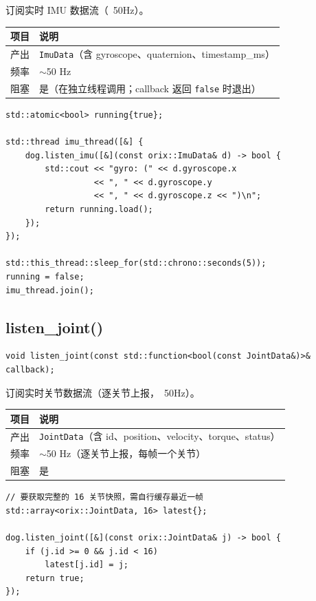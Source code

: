 \documentclass[a4paper,11pt,openany]{book}
\begin{document}
订阅实时 IMU 数据流（~50Hz）。

\begin{longtable}{ll}
\toprule
项目 & 说明 \\
\midrule
\endhead
产出 & \texttt{ImuData}（含 gyroscope、quaternion、timestamp\_ms）\\
频率 & $\sim$50 Hz \\
阻塞 & 是（在独立线程调用；callback 返回 \texttt{false} 时退出）\\
\bottomrule
\end{longtable}

\begin{lstlisting}[style=cpp]
std::atomic<bool> running{true};

std::thread imu_thread([&] {
    dog.listen_imu([&](const orix::ImuData& d) -> bool {
        std::cout << "gyro: (" << d.gyroscope.x
                  << ", " << d.gyroscope.y
                  << ", " << d.gyroscope.z << ")\n";
        return running.load();
    });
});

std::this_thread::sleep_for(std::chrono::seconds(5));
running = false;
imu_thread.join();
\end{lstlisting}

\subsection{listen\_joint()}

\begin{lstlisting}[style=cpp,numbers=none]
void listen_joint(const std::function<bool(const JointData&)>& callback);
\end{lstlisting}

订阅实时关节数据流（逐关节上报，~50Hz）。

\begin{longtable}{ll}
\toprule
项目 & 说明 \\
\midrule
\endhead
产出 & \texttt{JointData}（含 id、position、velocity、torque、status）\\
频率 & $\sim$50 Hz（逐关节上报，每帧一个关节）\\
阻塞 & 是 \\
\bottomrule
\end{longtable}

\begin{lstlisting}[style=cpp]
// 要获取完整的 16 关节快照，需自行缓存最近一帧
std::array<orix::JointData, 16> latest{};

dog.listen_joint([&](const orix::JointData& j) -> bool {
    if (j.id >= 0 && j.id < 16)
        latest[j.id] = j;
    return true;
});
\end{lstlisting}
\end{document}
